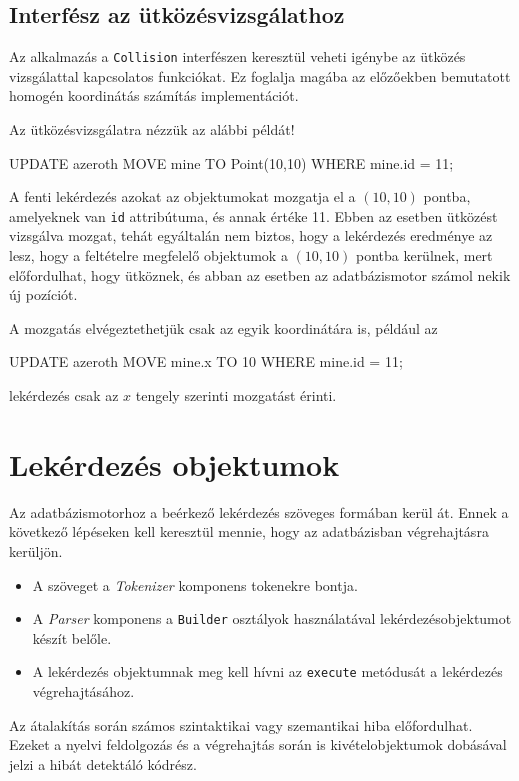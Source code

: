 \subsection{Interfész az ütközésvizsgálathoz}

Az alkalmazás a \texttt{Collision} interfészen keresztül veheti igénybe az ütközés vizsgálattal kapcsolatos funkciókat. Ez foglalja magába az előzőekben bemutatott homogén koordinátás számítás implementációt.

Az ütközésvizsgálatra nézzük az alábbi példát!
\begin{sql}
UPDATE azeroth MOVE mine TO Point(10,10) WHERE mine.id = 11; 
\end{sql}
A fenti lekérdezés azokat az objektumokat mozgatja el a $(10, 10)$ pontba, amelyeknek van \texttt{id} attribútuma, és annak értéke 11. Ebben az esetben ütközést vizsgálva mozgat, tehát egyáltalán nem biztos, hogy a lekérdezés eredménye az lesz, hogy a feltételre megfelelő objektumok a $(10, 10)$ pontba kerülnek, mert előfordulhat, hogy ütköznek, és abban az esetben az adatbázismotor számol nekik új pozíciót.

A mozgatás elvégeztethetjük csak az egyik koordinátára is, például az
\begin{sql}
UPDATE azeroth MOVE mine.x TO 10 WHERE mine.id = 11;
\end{sql}
lekérdezés csak az $x$ tengely szerinti mozgatást érinti.

\section{Lekérdezés objektumok}

Az adatbázismotorhoz a beérkező lekérdezés szöveges formában kerül át. Ennek a következő lépéseken kell keresztül mennie, hogy az adatbázisban végrehajtásra kerüljön.
\begin{itemize}
\item A szöveget a \textit{Tokenizer} komponens tokenekre bontja.
\item A \textit{Parser} komponens a \texttt{Builder} osztályok használatával lekérdezésobjektumot készít belőle.
\item A lekérdezés objektumnak meg kell hívni az \texttt{execute} metódusát a lekérdezés végrehajtásához.
\end{itemize}

Az átalakítás során számos szintaktikai vagy szemantikai hiba előfordulhat. Ezeket a nyelvi feldolgozás és a végrehajtás során is kivételobjektumok dobásával jelzi a hibát detektáló kódrész.

